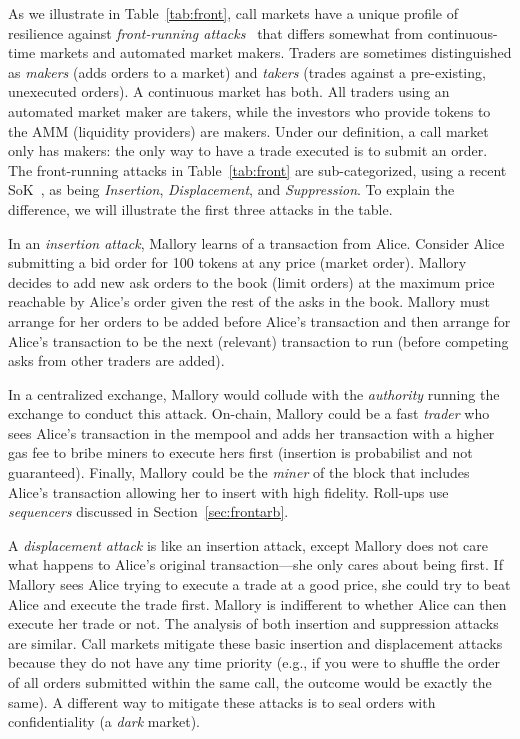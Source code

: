 As we illustrate in Table~\ref{tab:front}, call markets have a unique profile of resilience against \emph{front-running attacks}~\cite{clark2014decentralizing,eskandari2019sok,daian2019flash} that differs somewhat from continuous-time markets and automated market makers. Traders are sometimes distinguished as \emph{makers} (adds orders to a market) and \emph{takers} (trades against a pre-existing, unexecuted orders). A continuous market has both. All traders using an automated market maker are takers, while the investors who provide tokens to the AMM (liquidity providers) are makers. Under our definition, a call market only has makers: the only way to have a trade executed is to submit an order. The front-running attacks in Table~\ref{tab:front} are sub-categorized, using a recent SoK~\cite{eskandari2019sok}, as being \emph{Insertion}, \emph{Displacement}, and \emph{Suppression}. To explain the difference, we will illustrate the first three attacks in the table.

In an \emph{insertion attack}, Mallory learns of a transaction from Alice. Consider Alice submitting a bid order for 100 tokens at any price (market order). Mallory decides to add new ask orders to the book (limit orders) at the maximum price reachable by Alice's order given the rest of the asks in the book. Mallory must arrange for her orders to be added before Alice's transaction and then arrange for Alice's transaction to be the next (relevant) transaction to run (\eg before competing asks from other traders are added).

In a centralized exchange, Mallory would collude with the \emph{authority} running the exchange to conduct this attack. On-chain, Mallory could be a fast \emph{trader} who sees Alice's transaction in the mempool and adds her transaction with a higher gas fee to bribe miners to execute hers first (insertion is probabilist and not guaranteed). Finally, Mallory could be the \emph{miner} of the block that includes Alice's transaction allowing her to insert with high fidelity. Roll-ups use \emph{sequencers} discussed in Section~\ref{sec:frontarb}.

A \emph{displacement attack} is like an insertion attack, except Mallory does not care what happens to Alice's original transaction---she only cares about being first. If Mallory sees Alice trying to execute a trade at a good price, she could try to beat Alice and execute the trade first. Mallory is indifferent to whether Alice can then execute her trade or not. The analysis of both insertion and suppression attacks are similar.  Call markets mitigate these basic insertion and displacement attacks because they do not have any time priority (e.g., if you were to shuffle the order of all orders submitted within the same call, the outcome would be exactly the same). A different way to mitigate these attacks is to seal orders with confidentiality (a \textit{dark} market).


